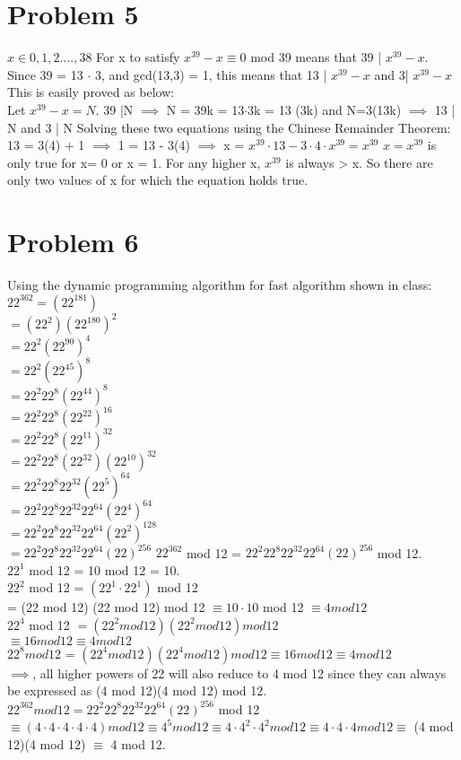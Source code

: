 \documentclass[english]{article}
\begin{document}
\section*{Problem 5}
$ x \in {0,1,2....,38}$ For x to satisfy $x^{39} - x \equiv 0 $ mod 39 means that 39 | $x^{39} - x$. \\ 
Since 39 = 13 $\cdot$ 3, and gcd(13,3) = 1, this means that 13 | $x^{39} - x$ and 3| $x^{39} - x$ \\
This is easily proved as below: \\
Let $x^{39} - x = N$. 39 |N $\implies$ N = 39k = 13$\cdot$3k = 13 (3k) and N=3(13k) $\implies$ 13 | N and 3 | N
Solving these two equations using the Chinese Remainder Theorem:\\
13 = 3(4) + 1 $\implies$ 1 = 13 - 3(4) $\implies$  x = $x^{39} \cdot 13 - 3 \cdot 4 \cdot x^{39} = x^{39}$
$x = x^{39}$ is only true for x= 0  or x = 1. For any higher x, $x^{39}$ is always > x. So there are only two values of x for which the equation holds true.
\section*{Problem 6}
Using the dynamic programming algorithm for fast algorithm shown in class:
$ 22^{362} = (22 ^ {181}) $\\$= (22^2) (22^{180})^2 $\\$= 22^2 (22^{90})^4 $\\$= 22^2 (22^{45})^8 $\\$= 22^2 22^8 (22^{44})^8 $\\$= 22^2 22^8 (22^{22})^{16} $\\$ = 22^2 22^8 (22^{11})^{32} $\\$ = 22^2 22^8 (22^{32}) (22^{10})^{32} $\\$ = 22^2 22^8 22^{32} (22^5)^{64} $\\$ = 22^2 22^8 22^{32} 22^{64} (22^4)^{64} $\\$ = 22^2 22^8 22^{32} 22^{64} (22^2)^{128} $\\$ = 22^2 22^8 22^{32} 22^{64} (22)^{256} $  
$ 22^{362}$ mod 12 = $22^2 22^8 22^{32} 22^{64} (22)^{256}$ mod 12. \\
$22^1$ mod 12  = 10 mod 12 = 10. \\
$22^2$ mod 12  = $(22^1 \cdot 22^1)$ mod 12 \\ = (22 mod 12) (22 mod 12) mod 12 $\equiv 10 \cdot 10$ mod 12 $\equiv 4 mod 12$
\\$22^4$ mod 12 $= (22^2 mod 12)(22^2 mod 12) mod 12$ \\ $ \equiv 16 mod 12 \equiv 4 mod 12$ 
\\$22^8 mod 12$ = $(22^4 mod 12)(22^4 mod 12) mod 12 \equiv 16 mod 12 \equiv 4 mod 12$
\\ $\implies$, all higher powers of 22 will also reduce to 4 mod 12 since they can always be expressed as (4 mod 12)(4 mod 12) mod 12.\\
$22^{362} mod 12 = 22^2 22^8 22^{32} 22^{64} (22)^{256}$ mod 12 $\equiv (4 \cdot 4 \cdot 4 \cdot 4 \cdot 4) mod 12 \equiv 4^5 mod 12 \equiv 4 \cdot 4^2 \cdot 4^2 mod 12 \equiv 4 \cdot 4 \cdot 4 mod 12 \equiv$ (4 mod 12)(4 mod 12) $\equiv$ 4 mod 12.

 
\end{document}

